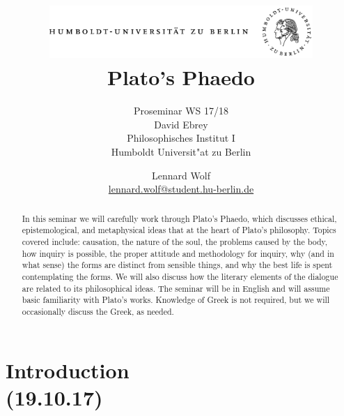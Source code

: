\documentclass[emulatestandardclasses]{scrartcl}
\date{\vspace{-3ex}}
\begin{document}
\title{
	\includegraphics*[width=0.75\textwidth]{ErstesSem/images/hu_logo.png}\\
	\vspace{24pt}
	Plato's Phaedo}
\subtitle{\vspace{10pt}Proseminar WS 17/18\\
          David Ebrey\\
          Philosophisches Institut I \\ 
          Humboldt Universit"at zu Berlin}
\author{Lennard Wolf\\
        \small{\href{mailto:lennard.wolf@student.hu-berlin.de}{lennard.wolf@student.hu-berlin.de}}}
\maketitle
\begin{abstract}
In this seminar we will carefully work through Plato's Phaedo, which discusses ethical, epistemological, and metaphysical ideas that at the heart of Plato’s philosophy. Topics covered include: causation, the nature of the soul, the problems caused by the body, how inquiry is possible, the proper attitude and methodology for inquiry, why (and in what sense) the forms are distinct from sensible things, and why the best life is spent contemplating the forms. We will also discuss how the literary elements of the dialogue are related to its philosophical ideas.
The seminar will be in English and will assume basic familiarity with Plato's works. Knowledge of Greek is not required, but we will occasionally discuss the Greek, as needed.
\end{abstract}
\newpage

\tableofcontents
\newpage


\section{Introduction\\(19.10.17)}
\end{document}
